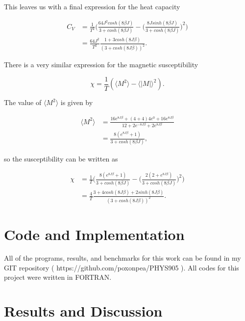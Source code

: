 \documentclass[%
oneside,                 %
final,                   %
10pt]{article}
\begin{document}
This leaves us with a final expression for the heat capacity

\begin{equation*}
\begin{split}
C_V & =\frac{1}{T^2} \Big( \frac{64 J^2 cosh(8 \beta J)}{3 + cosh(8 \beta J)}-  \Big(\frac{8 J sinh(8 \beta J)}{3 + cosh(8 \beta J)}\Big)^2 \Big) \\
&=\frac{64 J^2}{T^2}  \frac{1+3 cosh(8J \beta)}{(3 + cosh(8J \beta))^2}.
\end{split}
\end{equation*}

There is a very similar expression for the magnetic susceptibility 

\begin{equation*}
\chi=\frac{1}{T} (\langle M^2 \rangle - \langle |M| \rangle ^2).
\end{equation*}

The value of $\langle M^2 \rangle$ is given by

\begin{equation*}
\begin{split}
\langle M^2 \rangle & = \frac{16 e^{8 J \beta}+(4+4)4e^0 +16 e^{8 J \beta}}{12+2e^{-8 J \beta} + 2e^{8 J \beta}} \\
& = \frac{8(e^{8J\beta}+1)}{3 + cosh(8 \beta J)},
\end{split}
\end{equation*}

so the susceptibility can be written as 

\begin{equation*}
\begin{split}
\chi & =\frac{1}{T} \Big( \frac{8(e^{8J\beta}+1)}{3 + cosh(8 \beta J)} -  \Big(\frac{2(2+e^{8 J \beta})}{3 + cosh(8 \beta J)}\Big)^2 \Big) \\
&=\frac{4}{T}  \frac{3+4 cosh(8J \beta) + 2 sinh(8 J \beta)}{(3 + cosh(8J \beta))^2}.
\end{split}
\end{equation*}


\section{Code and Implementation}

All of the programs, results, and benchmarks for this work can be found in my GIT repository ( https://github.com/poxonpea/PHYS905 ).  All codes for this project were written in FORTRAN.

\section{Results and Discussion}
\end{document}
